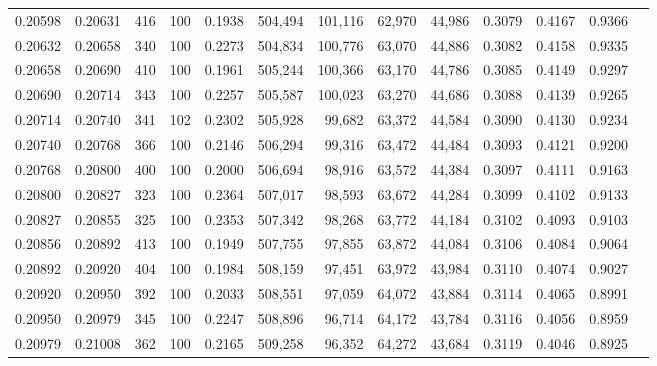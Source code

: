 \begin{tabular}{rrrrrrrrrrrrr}
0.20598 & 0.20631 &   416 & 100 &                                     0.1938 & 504,494 & 101,116 &  62,970 &  44,986 & 0.3079 & 0.4167 & 0.9366 \\
0.20632 & 0.20658 &   340 & 100 &                                     0.2273 & 504,834 & 100,776 &  63,070 &  44,886 & 0.3082 & 0.4158 & 0.9335 \\
0.20658 & 0.20690 &   410 & 100 &                                     0.1961 & 505,244 & 100,366 &  63,170 &  44,786 & 0.3085 & 0.4149 & 0.9297 \\
0.20690 & 0.20714 &   343 & 100 &                                     0.2257 & 505,587 & 100,023 &  63,270 &  44,686 & 0.3088 & 0.4139 & 0.9265 \\
0.20714 & 0.20740 &   341 & 102 &                                     0.2302 & 505,928 &  99,682 &  63,372 &  44,584 & 0.3090 & 0.4130 & 0.9234 \\
0.20740 & 0.20768 &   366 & 100 &                                     0.2146 & 506,294 &  99,316 &  63,472 &  44,484 & 0.3093 & 0.4121 & 0.9200 \\
0.20768 & 0.20800 &   400 & 100 &                                     0.2000 & 506,694 &  98,916 &  63,572 &  44,384 & 0.3097 & 0.4111 & 0.9163 \\
0.20800 & 0.20827 &   323 & 100 &                                     0.2364 & 507,017 &  98,593 &  63,672 &  44,284 & 0.3099 & 0.4102 & 0.9133 \\
0.20827 & 0.20855 &   325 & 100 &                                     0.2353 & 507,342 &  98,268 &  63,772 &  44,184 & 0.3102 & 0.4093 & 0.9103 \\
0.20856 & 0.20892 &   413 & 100 &                                     0.1949 & 507,755 &  97,855 &  63,872 &  44,084 & 0.3106 & 0.4084 & 0.9064 \\
0.20892 & 0.20920 &   404 & 100 &                                     0.1984 & 508,159 &  97,451 &  63,972 &  43,984 & 0.3110 & 0.4074 & 0.9027 \\
0.20920 & 0.20950 &   392 & 100 &                                     0.2033 & 508,551 &  97,059 &  64,072 &  43,884 & 0.3114 & 0.4065 & 0.8991 \\
0.20950 & 0.20979 &   345 & 100 &                                     0.2247 & 508,896 &  96,714 &  64,172 &  43,784 & 0.3116 & 0.4056 & 0.8959 \\
0.20979 & 0.21008 &   362 & 100 &                                     0.2165 & 509,258 &  96,352 &  64,272 &  43,684 & 0.3119 & 0.4046 & 0.8925 \\

\end{tabular}

